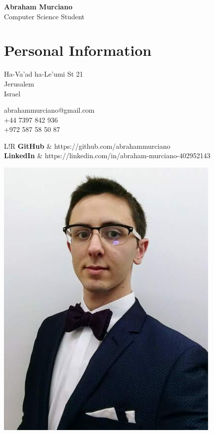 \documentclass{article}
\newcommand\VRule{\color{lightgray}\vrule width 0.4pt}
\begin{document}
\hspace{-18.4pt}
\begin{minipage}{0.69\textwidth}
	{\bfseries\Huge Abraham Murciano}\vspace{4pt}\\
	{\large Computer Science Student}

	\section*{Personal Information}
	\begin{multicols}{2}
		Ha-Va'ad ha-Le'umi St 21\\
		Jerusalem\\
		Israel
		\columnbreak

		abrahammurciano@gmail.com\\
		+44 7397 842 936\\
		+972 587 58 50 87
		\columnbreak
	\end{multicols}
	\begin{tabular}{L!{\VRule}R}
		\textbf{GitHub}   & https://github.com/abrahammurciano \\
		\textbf{LinkedIn} & https://linkedin.com/in/abraham-murciano-402952143
	\end{tabular}
\end{minipage}
%
\begin{minipage}{0.3\textwidth}
	\begin{flushright}
		\includegraphics{profile.jpg}
	\end{flushright}
\end{minipage}
\end{document}
